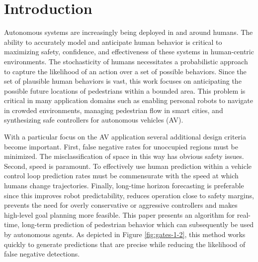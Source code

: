 \documentclass[letterpaper,10pt,conference]{ieeetran}
\begin{document}

\section{Introduction}

Autonomous systems are increasingly being deployed in and around humans. 
The ability to accurately model and anticipate human behavior is critical to maximizing safety, confidence, and effectiveness of these systems in human-centric environments. 
The stochasticity of humans necessitates a probabilistic approach to capture the likelihood of an action over a set of possible behaviors. 
Since the set of plausible human behaviors is vast, this work focuses on anticipating the possible future locations of pedestrians within a bounded area. 
This problem is critical in many application domains such as enabling personal robots to navigate in crowded environments, managing pedestrian flow in smart cities, and synthesizing safe controllers for autonomous vehicles (AV).  

With a particular focus on the AV application several additional design criteria become important. 
First, false negative rates for unoccupied regions must be minimized.
The misclassification of space in this way has obvious safety issues.
Second, speed is paramount.
To effectively use human prediction within a vehicle control loop prediction rates must be commensurate with the speed at which humans change trajectories.
Finally, long-time horizon forecasting is preferable since this improves robot predictability, reduces operation close to safety margins, prevents the need for overly conservative or aggressive controllers and makes high-level goal planning more feasible.
This paper presents an algorithm for real-time, long-term prediction of pedestrian behavior which can subsequently be used by autonomous agents.
As depicted in Figure \ref{fig:gates-1-2}, this method works quickly to generate predictions that are precise while reducing the likelihood of false negative detections.
\end{document}
